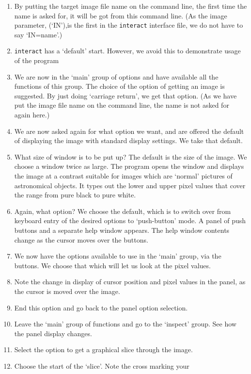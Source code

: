 \begin{small}
{{\begin{enumerate}
\item By putting the target image file name on the command line, the
      first time the name is asked for, it will be got from this
      command line. (As the image parameter, (`IN'),is the first in
      the \verb|interact| interface file, we do not have to say `IN=name'.)
\item \verb|interact| has a `default' start. However, we avoid this to
      demonstrate usage of the program
\item We are now in the `main' group of options and have available all
      the functions of this group. The choice of the option of
      getting an image is suggested. By just doing `carriage return',
      we get that option. (As we have put the image file name on the
      command line, the name is not asked for again here.)
\item We are now asked again for what option we want, and are
      offered the default of displaying the image with standard display
      settings. We take that default.
\item What size of window is to be put up? The default is the size of
      the image. We choose a window twice as large. The program opens
      the window and displays the image at a contrast suitable for
      images which are `normal' pictures of astronomical objects. It
      types out the lower and upper pixel values that cover the range
      from pure black to pure white.
\item Again, what option? We choose the default, which is
      to switch over from keyboard entry of the desired options to
      `push-button' mode. A panel of push buttons and a separate help
      window appears. The help window contents change as the
      cursor moves over the buttons.
\item We now have the options available to use in the `main' group,
      via the buttons. We choose that which will let us look at the
      pixel values.
\item Note the change in display of cursor position and pixel values
      in the panel, as the cursor is moved over the image.
\item End this option and go back to the panel option selection.
\item Leave the `main' group of functions and go to the `inspect'
      group. See how the panel display changes.
\item Select the option to get a graphical slice through the image.
\item Choose the start of the `slice'. Note the cross marking your

\end{enumerate}}}
\end{small}
